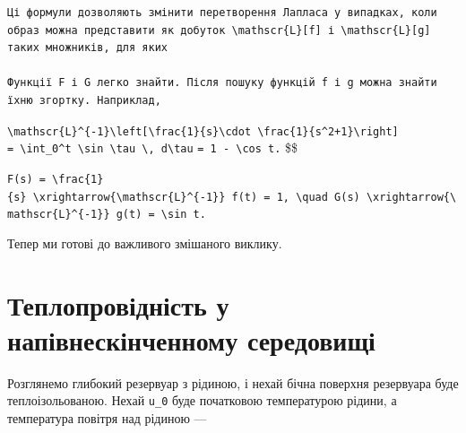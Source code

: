 \documentclass[
  ukrainian,
]{article}
\begin{document}
\begin{verbatim}
Ці формули дозволяють змінити перетворення Лапласа у випадках, коли образ можна представити як добуток \mathscr{L}[f] і \mathscr{L}[g] таких множників, для яких

Функції F і G легко знайти. Після пошуку функцій f і g можна знайти їхню згортку. Наприклад,
\end{verbatim}

\texttt{\textbackslash{}mathscr\{L\}\^{}\{-1\}\textbackslash{}left{[}\textbackslash{}frac\{1\}\{s\}\textbackslash{}cdot\ \textbackslash{}frac\{1\}\{s\^{}2+1\}\textbackslash{}right{]}}
\texttt{=\ \textbackslash{}int\_0\^{}t\ \textbackslash{}sin\ \textbackslash{}tau\ \textbackslash{},\ d\textbackslash{}tau}
\texttt{=\ 1\ -\ \textbackslash{}cos\ t.} \$\$

\texttt{\textquotesingle{}F(s)\ =\ \textbackslash{}frac\{1\}\{s\}\ \textbackslash{}xrightarrow\{\textbackslash{}mathscr\{L\}\^{}\{-1\}\}\ f(t)\ =\ 1\textquotesingle{},\ \textbackslash{}quad\ \textquotesingle{}G(s)\ \textbackslash{}xrightarrow\{\textbackslash{}mathscr\{L\}\^{}\{-1\}\}\ g(t)\ =\ \textbackslash{}sin\ t\textquotesingle{}.}

Тепер ми готові до важливого змішаного виклику.

\section{Теплопровідність у напівнескінченному
середовищі}\label{ux442ux435ux43fux43bux43eux43fux440ux43eux432ux456ux434ux43dux456ux441ux442ux44c-ux443-ux43dux430ux43fux456ux432ux43dux435ux441ux43aux456ux43dux447ux435ux43dux43dux43eux43cux443-ux441ux435ux440ux435ux434ux43eux432ux438ux449ux456}

Розглянемо глибокий резервуар з рідиною, і нехай бічна поверхня
резервуара буде теплоізольованою. Нехай \texttt{u\_0} буде початковою
температурою рідини, а температура повітря над рідиною ---
\end{document}
